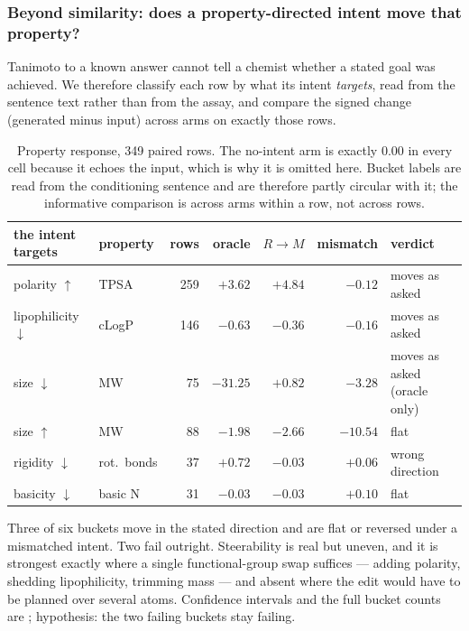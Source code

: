 \subsubsection{Beyond similarity: does a property-directed intent move that property?}

Tanimoto to a known answer cannot tell a chemist whether a stated goal was achieved. We therefore
classify each row by what its intent \emph{targets}, read from the sentence text rather than from the
assay, and compare the signed change (generated minus input) across arms on exactly those rows.

\begin{table}[H]\centering\small
\begin{tabular}{llrrrrl}
\toprule
the intent targets & property & rows & oracle & $R\!\rightarrow\!M$ & mismatch & verdict \\
\midrule
polarity $\uparrow$ & TPSA & 259 & $+3.62$ & $+4.84$ & $-0.12$ & moves as asked \\
lipophilicity $\downarrow$ & cLogP & 146 & $-0.63$ & $-0.36$ & $-0.16$ & moves as asked \\
size $\downarrow$ & MW & 75 & $-31.25$ & $+0.82$ & $-3.28$ & moves as asked (oracle only) \\
size $\uparrow$ & MW & 88 & $-1.98$ & $-2.66$ & $-10.54$ & flat \\
rigidity $\downarrow$ & rot.\ bonds & 37 & $+0.72$ & $-0.03$ & $+0.06$ & wrong direction \\
basicity $\downarrow$ & basic N & 31 & $-0.03$ & $-0.03$ & $+0.10$ & flat \\
\bottomrule
\end{tabular}
\caption{Property response, 349 paired rows. The no-intent arm is exactly $0.00$ in every cell
because it echoes the input, which is why it is omitted here. Bucket labels are read from the
conditioning sentence and are therefore partly circular with it; the informative comparison is
across arms within a row, not across rows.}
\label{tab:props}
\end{table}

Three of six buckets move in the stated direction and are flat or reversed under a mismatched
intent. Two fail outright. Steerability is real but uneven, and it is strongest exactly where a
single functional-group swap suffices --- adding polarity, shedding lipophilicity, trimming mass ---
and absent where the edit would have to be planned over several atoms. Confidence intervals and the
full bucket counts are ; hypothesis: the two failing buckets stay failing.

